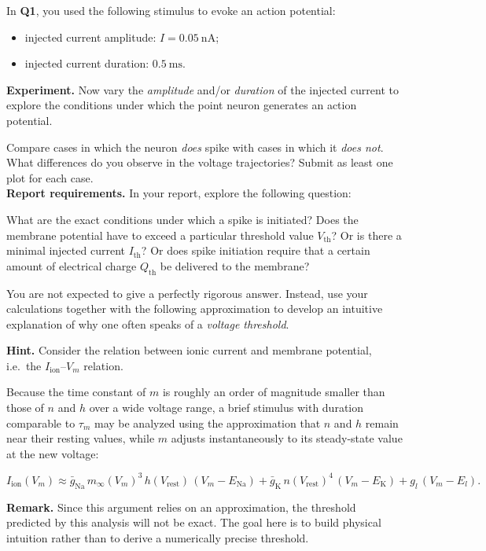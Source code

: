 \documentclass{article}
\begin{document}
In \textbf{Q1}, you used the following stimulus to evoke an action potential:
\begin{itemize}
    \item injected current amplitude: $I = \SI{0.05}{\nano\ampere}$;
    \item injected current duration: $\SI{0.5}{\milli\second}$.
\end{itemize}

\noindent\textbf{Experiment.}
Now vary the \emph{amplitude} and/or \emph{duration} of the injected current to explore the conditions under which the point neuron generates an action potential.

Compare cases in which the neuron \emph{does} spike with cases in which it \emph{does not}.
What differences do you observe in the voltage trajectories? Submit as least one plot for each case.\\

\noindent\textbf{Report requirements.}
In your report, explore the following question:

What are the exact conditions under which a spike is initiated?
Does the membrane potential have to exceed a particular threshold value $V_{\text{th}}$?
Or is there a minimal injected current $I_{\text{th}}$?
Or does spike initiation require that a certain amount of electrical charge $Q_{\text{th}}$ be delivered to the membrane?

You are not expected to give a perfectly rigorous answer. Instead, use your calculations together with the following approximation to develop an intuitive explanation of why one often speaks of a \textit{voltage threshold}.

\textbf{Hint.}
Consider the relation between ionic current and membrane potential, i.e.\ the $I_{\mathrm{ion}}$--$V_m$ relation.

Because the time constant of $m$ is roughly an order of magnitude smaller than those of $n$ and $h$ over a wide voltage range, a brief stimulus with duration comparable to $\tau_m$ may be analyzed using the approximation that $n$ and $h$ remain near their resting values, while $m$ adjusts instantaneously to its steady-state value at the new voltage:

\[
I_{\mathrm{ion}}(V_m)\approx
\bar g_{\scriptscriptstyle\mathrm{Na}}\,m_\infty(V_m)^3\,h(V_{\mathrm{rest}})\,(V_m-E_{\scriptscriptstyle\mathrm{Na}})
+
\bar g_{\scriptscriptstyle\mathrm{K}}\,n(V_{\mathrm{rest}})^4\,(V_m-E_{\scriptscriptstyle\mathrm{K}})
+
g_l\,(V_m-E_l).
\]

\textbf{Remark.}
Since this argument relies on an approximation, the threshold predicted by this analysis will not be exact. The goal here is to build physical intuition rather than to derive a numerically precise threshold.
\end{document}
